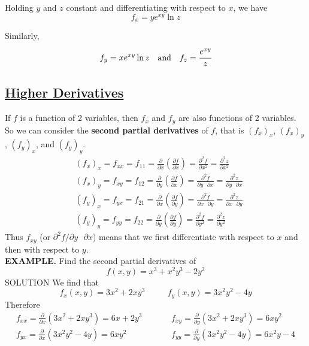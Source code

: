 \documentclass{article}
\begin{document}
Holding $y$ and $z $ constant and differentiating with respect to $x $, we have 
\[f_x = y e^{xy} \ln{z}\]

Similarly, \[f_y = x e^{xy} \ln {z} \quad  \text{and} \quad f_z = \cfrac{e^{xy}}{z }\]

\subsection*{{\selectfont \underline{Higher Derivatives}}}

If $f$ is a function of 2 variables, then $f_x$ and $f _ y $ are also functions of 2 variables.  So we can consider the \textbf{second partial derivatives} of $f$, that is $(f_x)_x$, $(f_x)_y $, $(f_y)_x $, and $(f_y)_y $.
\begin{equation*}
  \begin{split}
    & (f _ x ) _ x = f _ {xx} = f _ {11} = \frac{\partial }{\partial x } \left( \frac{\partial f }{ \partial x }\right) = \frac{\partial ^2 f }{\partial  x^2 } = \frac{\partial ^2 z }{\partial x^2 } \\
    & (f _ x ) _ y = f _ {xy} = f _ {12} = \frac{\partial }{\partial y } \left( \frac{\partial f }{ \partial x }\right) = \frac{\partial ^2 f }{\partial  y \text{ } \partial x } = \frac{\partial ^2 z }{\partial y \text{ }\partial x } \\
    & (f _ y ) _ x = f _ {yx} = f _ {21} = \frac{\partial }{\partial x } \left( \frac{\partial f }{ \partial y }\right) = \frac{\partial ^2 f }{\partial  x \text{ } \partial y } = \frac{\partial ^2 z }{\partial x \text{ }\partial y } \\
& (f _ y ) _ y = f _ {yy} = f _ {22} = \frac{\partial }{\partial y } \left( \frac{\partial f }{ \partial y }\right) = \frac{\partial ^2 f }{\partial  y^2 } = \frac{\partial ^2 z }{\partial y^2 }
  \end{split}
\end{equation*}
Thus $f_{xy}$ (or $\partial ^2 f / \partial y \text{ } \partial x $) means that we first differentiate with respect to $x $ and then with respect to $y $.\\
{\selectfont \textbf{\textcolor{blue5}{{\small {}} EXAMPLE.}}} Find the second partial derivatives of 
\[f(x,y) = x ^ 3 + x^2 y^3 - 2 y^2 \]
{\selectfont \textcolor{blue5}{\small SOLUTION}} We find that 
\[f_x(x,y) = 3 x^2 + 2x y^3 \quad \text{ } \quad f_y(x,y) = 3 x^2 y^2 - 4y \]
Therefore 
\begin{equation*}
  \begin{split}
    f _ {xx} = \frac{\partial }{\partial x } (3 x^2 + 2xy^3)  = 6x + 2 y^3 & \quad \text{ }  \quad f _ {xy} = \frac{\partial }{ \partial y } (3 x^2 + 2 x y^3) = 6x y^2 \\
    f _ {yx} = \frac{\partial }{\partial x } (3 x^2 y^2 - 4y) = 6x y^2 & \quad \text{ } \quad f_{yy} = \frac{\partial }{\partial y } (3 x^2 y^2 - 4y ) = 6 x^2 y - 4 
  \end{split}
\end{equation*}
\end{document}
